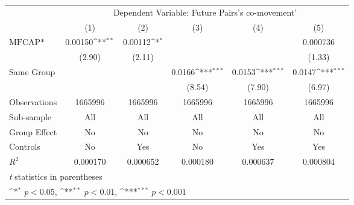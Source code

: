 {
\def\sym#1{\ifmmode^{#1}\else\(^{#1}\)\fi}
\begin{tabular}{l*{5}{c}}
\hline\hline
                &\multicolumn{5}{c}{Dependent Variable: Future Pairs's co-movement'}                           \\\cmidrule(lr){2-6}
                &\multicolumn{1}{c}{(1)}         &\multicolumn{1}{c}{(2)}         &\multicolumn{1}{c}{(3)}         &\multicolumn{1}{c}{(4)}         &\multicolumn{1}{c}{(5)}         \\
\hline
$ \text{MFCAP*} $&  0.00150\sym{**} &  0.00112\sym{*}  &                  &                  & 0.000736         \\
                &   (2.90)         &   (2.11)         &                  &                  &   (1.33)         \\
[1em]
Same Group      &                  &                  &   0.0166\sym{***}&   0.0153\sym{***}&   0.0147\sym{***}\\
                &                  &                  &   (8.54)         &   (7.90)         &   (6.97)         \\
\hline
Observations    &  1665996         &  1665996         &  1665996         &  1665996         &  1665996         \\
Sub-sample      &      All         &      All         &      All         &      All         &      All         \\
Group Effect    &       No         &       No         &       No         &       No         &       No         \\
Controls        &       No         &      Yes         &       No         &      Yes         &      Yes         \\
$ R^2 $         & 0.000170         & 0.000652         & 0.000180         & 0.000637         & 0.000804         \\
\hline\hline
\multicolumn{6}{l}{\footnotesize \textit{t} statistics in parentheses}\\
\multicolumn{6}{l}{\footnotesize \sym{*} \(p<0.05\), \sym{**} \(p<0.01\), \sym{***} \(p<0.001\)}\\
\end{tabular}
}
